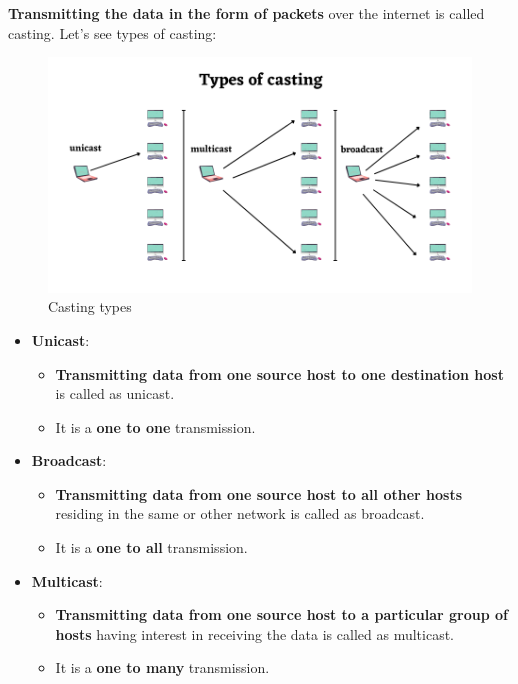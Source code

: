 \setlength{\columnsep}{3pt}
\begin{flushleft}
	\textbf{Transmitting the data in the form of packets} over the internet is called casting.
	\newline
	\bigskip
	Let's see types of casting:
	\begin{figure}[h!]
		\centering
		\includegraphics[scale=0.6]{content/chapter14/images/casting.png}
		\caption{Casting types}
		\label{fig:casting_types}
	\end{figure}

	\begin{itemize}
		\item \textbf{Unicast}: 
		\begin{itemize}
			\item \textbf{Transmitting data from one source host to one destination host} is called as unicast.
			\item It is a \textbf{one to one} transmission.
		\end{itemize}
	\item \textbf{Broadcast}: 
	\begin{itemize}
		\item \textbf{Transmitting data from one source host to all other hosts} residing in the same or other network is called as broadcast.
		\item It is a \textbf{one to all} transmission.
	\end{itemize}
	\item \textbf{Multicast}: 
	\begin{itemize}
		\item \textbf{Transmitting data from one source host to a particular group of hosts} having interest in receiving the data is called as multicast.
		\item It is a \textbf{one to many} transmission.
	\end{itemize}

	\end{itemize}


\end{flushleft}
\newpage



